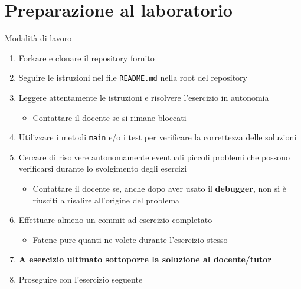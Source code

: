 \documentclass[presentation]{beamer}
\begin{document}
\section{Preparazione al laboratorio}

\begin{frame}{Modalità di lavoro}
	\begin{enumerate}
		\item Forkare e clonare il repository fornito
		\item Seguire le istruzioni nel file \texttt{README.md} nella root del repository
		\item Leggere attentamente le istruzioni e risolvere l'esercizio in autonomia
		\begin{itemize}
			\item Contattare il docente se si rimane bloccati
		\end{itemize}
		\item Utilizzare i metodi \texttt{main} e/o i test per verificare la correttezza delle soluzioni
		\item Cercare di risolvere autonomamente eventuali piccoli problemi che possono verificarsi durante lo svolgimento degli esercizi
		\begin{itemize}
			\item Contattare il docente se, anche dopo aver usato il \textbf{debugger}, non si è riusciti a risalire all'origine del problema
		\end{itemize}
		\item Effettuare almeno un commit ad esercizio completato
		\begin{itemize}
			\item Fatene pure quanti ne volete durante l'esercizio stesso
		\end{itemize}
		\item \textbf{A esercizio ultimato sottoporre la soluzione al docente/tutor}
		\item Proseguire con l'esercizio seguente
	\end{enumerate}
\end{frame}
\end{document}
